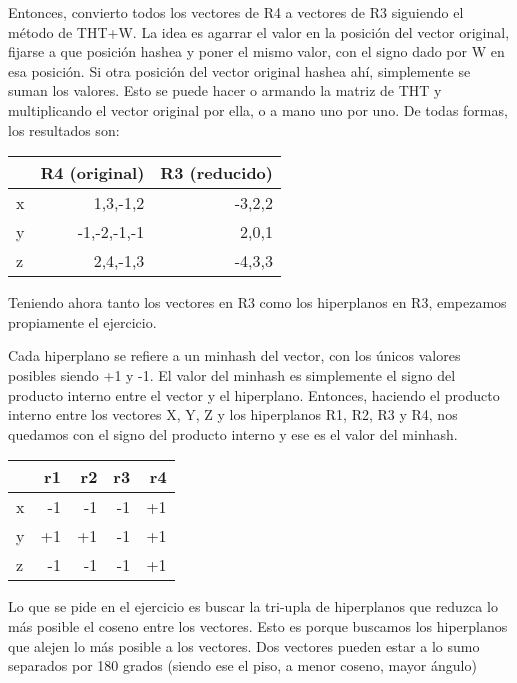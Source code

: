 \documentclass[a4paper]{article}
\begin{document}
    Entonces, convierto todos los vectores de R4 a vectores de R3 siguiendo el método de THT+W. La idea es agarrar el valor en la posición del vector original, fijarse a que posición hashea y poner el mismo valor, con el signo dado por W en esa posición. Si otra posición del vector original hashea ahí, simplemente se suman los valores. Esto se puede hacer o armando la matriz de THT y multiplicando el vector original por ella, o a mano uno por uno. De todas formas, los resultados son:

    \begin{table}[H]
        \begin{tabular}{|l|r|r|}
        \hline
         & R4 (original) & R3 (reducido) \\
        \hline 
        x & 1,3,-1,2     & -3,2,2       \\
        y & -1,-2,-1,-1  & 2,0,1        \\
        z & 2,4,-1,3     & -4,3,3       \\
        \hline
        \end{tabular}
    \end{table}

    Teniendo ahora tanto los vectores en R3 como los hiperplanos en R3, empezamos propiamente el ejercicio.

    Cada hiperplano se refiere a un minhash del vector, con los únicos valores posibles siendo +1 y -1. El valor del minhash es simplemente el signo del producto interno entre el vector y el hiperplano. Entonces, haciendo el producto interno entre los vectores X, Y, Z y los hiperplanos R1, R2, R3 y R4, nos quedamos con el signo del producto interno y ese es el valor del minhash.

    \begin{table}[H]
        \begin{tabular}{|l|r|r|r|r|}
          \hline
          & r1 & r2 & r3 & r4 \\
          \hline
        x & -1 & -1 & -1 & +1 \\
        y & +1 & +1 & -1 & +1 \\
        z & -1 & -1 & -1 & +1 \\
        \hline
    \end{tabular}
    \end{table}

    Lo que se pide en el ejercicio es buscar la tri-upla de hiperplanos que reduzca lo más posible el coseno entre los vectores. Esto es porque buscamos los hiperplanos que alejen lo más posible a los vectores. Dos vectores pueden estar a lo sumo separados por 180 grados (siendo ese el piso, a menor coseno, mayor ángulo)
    
\end{document}
